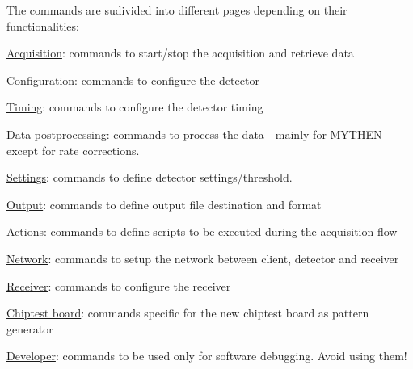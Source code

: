 The commands are sudivided into different pages depending on their functionalities:
\begin{DoxyItemize}
\item \hyperlink{acquisition}{Acquisition}: commands to start/stop the acquisition and retrieve data
\item \hyperlink{config}{Configuration}: commands to configure the detector
\item \hyperlink{timing}{Timing}: commands to configure the detector timing
\item \hyperlink{data}{Data postprocessing}: commands to process the data -\/ mainly for MYTHEN except for rate corrections.
\item \hyperlink{settings}{Settings}: commands to define detector settings/threshold.
\item \hyperlink{output}{Output}: commands to define output file destination and format
\item \hyperlink{actions}{Actions}: commands to define scripts to be executed during the acquisition flow
\item \hyperlink{network}{Network}: commands to setup the network between client, detector and receiver
\item \hyperlink{receiver}{Receiver}: commands to configure the receiver
\item \hyperlink{ctb}{Chiptest board}: commands specific for the new chiptest board as pattern generator
\item \hyperlink{test}{Developer}: commands to be used only for software debugging. Avoid using them! 
\end{DoxyItemize}